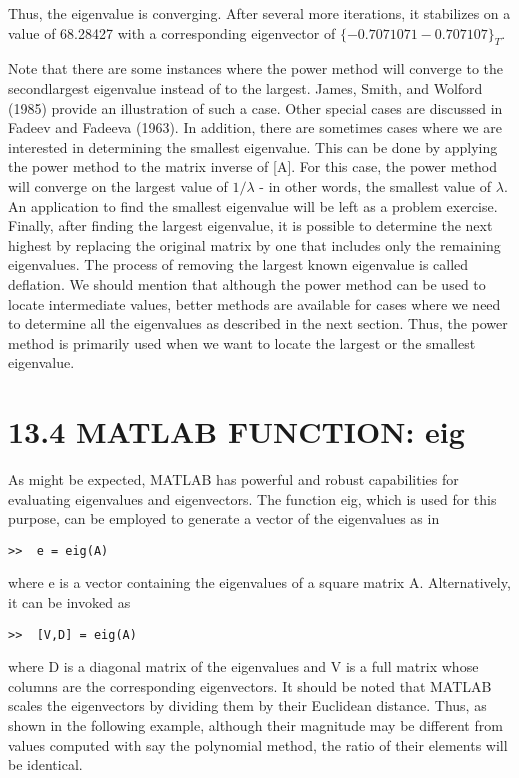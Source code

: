 \documentclass[../main.tex]{subfiles}
\begin{document}
Thus, the eigenvalue is converging. After several more iterations, it stabilizes on a
value of 68.28427 with a corresponding eigenvector of $\{-0.707107 1 -0.707107\}_{T}$.


Note that there are some instances where the power method will converge to the secondlargest eigenvalue instead of to the largest. James, Smith, and Wolford (1985) provide an
illustration of such a case. Other special cases are discussed in Fadeev and Fadeeva (1963).
In addition, there are sometimes cases where we are interested in determining the
smallest eigenvalue. This can be done by applying the power method to the matrix inverse
of [A]. For this case, the power method will converge on the largest value of $1/\lambda$ - in other words, the smallest value of $\lambda$. An application to find the smallest eigenvalue will be left as
a problem exercise.
Finally, after finding the largest eigenvalue, it is possible to determine the next highest
by replacing the original matrix by one that includes only the remaining eigenvalues. The
process of removing the largest known eigenvalue is called deflation.
We should mention that although the power method can be used to locate intermediate
values, better methods are available for cases where we need to determine all the eigenvalues as described in the next section. Thus, the power method is primarily used when we
want to locate the largest or the smallest eigenvalue.


\section*{13.4 MATLAB FUNCTION: eig}

As might be expected, MATLAB has powerful and robust capabilities for evaluating eigenvalues and eigenvectors. The function eig, which is used for this purpose, can be employed
to generate a vector of the eigenvalues as in

\begin{lstlisting}[numbers=none]
>>  e = eig(A)
\end{lstlisting}

where e is a vector containing the eigenvalues of a square matrix A. Alternatively, it can be
invoked as

\begin{lstlisting}[numbers=none]
>>  [V,D] = eig(A)
\end{lstlisting}

where D is a diagonal matrix of the eigenvalues and V is a full matrix whose columns are
the corresponding eigenvectors.
It should be noted that MATLAB scales the eigenvectors by dividing them by their
Euclidean distance. Thus, as shown in the following example, although their magnitude
may be different from values computed with say the polynomial method, the ratio of their
elements will be identical.
\end{document}
